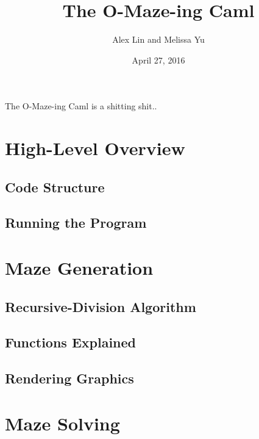 \documentclass[11pt, margin=1in]{article}
\begin{document}
\title{The O-Maze-ing Caml}
\author{Alex Lin and Melissa Yu}
\date{April 27, 2016}
\maketitle

The O-Maze-ing Caml is a shitting shit..

\section{High-Level Overview}

\subsection{Code Structure}  %

\subsection{Running the Program} %

\section{Maze Generation}

\subsection{Recursive-Division Algorithm}  %

\subsection{Functions Explained} %

\subsection{Rendering Graphics} %


\section{Maze Solving} 
\end{document}
